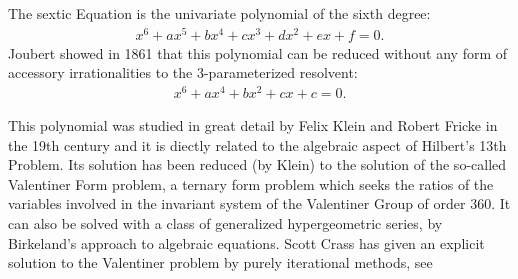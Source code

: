 \documentclass[12pt]{article}
\newcommand{\<}{\langle}
\renewcommand{\>}{\rangle}
\begin{document}
The sextic Equation is the univariate polynomial of the sixth degree:
\begin{align*}
x^6+ax^5+bx^4+cx^3+dx^2+ex+f = 0.
\end{align*}
Joubert showed in 1861 that this polynomial can be reduced without any form of accessory irrationalities to the 3-parameterized resolvent:
\begin{align*}
x^6+ax^4+bx^2+cx+c = 0.
\end{align*}
 
This polynomial was studied in great detail by Felix Klein and Robert Fricke in the 19th century and it is diectly related to the algebraic aspect of Hilbert's 13th Problem. Its solution has been reduced (by Klein) to the solution of the so-called Valentiner Form problem, a ternary form problem which seeks the ratios of the variables involved in the invariant system of the Valentiner Group of order 360. It can also be solved with a class of generalized hypergeometric series, by Birkeland's approach to algebraic equations. Scott Crass has given an explicit solution to the Valentiner problem by purely iterational methods, see
\end{document}
